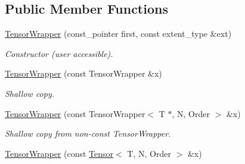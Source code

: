 \subsection*{Public Member Functions}
\begin{DoxyCompactItemize}
\item 
\hypertarget{classbtas_1_1_tensor_wrapper_3_01const_01_t_01_5_00_01_n_00_01_order_01_4_a5f4ccf42e69b2481463fc33a0eeeb284}{
\hyperlink{classbtas_1_1_tensor_wrapper_3_01const_01_t_01_5_00_01_n_00_01_order_01_4_a5f4ccf42e69b2481463fc33a0eeeb284}{TensorWrapper} (const\_\-pointer first, const extent\_\-type \&ext)}
\label{classbtas_1_1_tensor_wrapper_3_01const_01_t_01_5_00_01_n_00_01_order_01_4_a5f4ccf42e69b2481463fc33a0eeeb284}

\begin{DoxyCompactList}\small\item\em Constructor (user accessible). \item\end{DoxyCompactList}\item 
\hypertarget{classbtas_1_1_tensor_wrapper_3_01const_01_t_01_5_00_01_n_00_01_order_01_4_a38a7fd6d379ec2514d2317e8e6494313}{
\hyperlink{classbtas_1_1_tensor_wrapper_3_01const_01_t_01_5_00_01_n_00_01_order_01_4_a38a7fd6d379ec2514d2317e8e6494313}{TensorWrapper} (const TensorWrapper \&x)}
\label{classbtas_1_1_tensor_wrapper_3_01const_01_t_01_5_00_01_n_00_01_order_01_4_a38a7fd6d379ec2514d2317e8e6494313}

\begin{DoxyCompactList}\small\item\em Shallow copy. \item\end{DoxyCompactList}\item 
\hypertarget{classbtas_1_1_tensor_wrapper_3_01const_01_t_01_5_00_01_n_00_01_order_01_4_ae0c6918e9a004b55813f477f13b9a629}{
\hyperlink{classbtas_1_1_tensor_wrapper_3_01const_01_t_01_5_00_01_n_00_01_order_01_4_ae0c6918e9a004b55813f477f13b9a629}{TensorWrapper} (const TensorWrapper$<$ T $\ast$, N, Order $>$ \&x)}
\label{classbtas_1_1_tensor_wrapper_3_01const_01_t_01_5_00_01_n_00_01_order_01_4_ae0c6918e9a004b55813f477f13b9a629}

\begin{DoxyCompactList}\small\item\em Shallow copy from non-\/const TensorWrapper. \item\end{DoxyCompactList}\item 
\hypertarget{classbtas_1_1_tensor_wrapper_3_01const_01_t_01_5_00_01_n_00_01_order_01_4_abc6709fec3955de2dafeabb2a8cf8e18}{
\hyperlink{classbtas_1_1_tensor_wrapper_3_01const_01_t_01_5_00_01_n_00_01_order_01_4_abc6709fec3955de2dafeabb2a8cf8e18}{TensorWrapper} (const \hyperlink{classbtas_1_1_tensor}{Tensor}$<$ T, N, Order $>$ \&x)}
\label{classbtas_1_1_tensor_wrapper_3_01const_01_t_01_5_00_01_n_00_01_order_01_4_abc6709fec3955de2dafeabb2a8cf8e18}


\end{DoxyCompactItemize}

